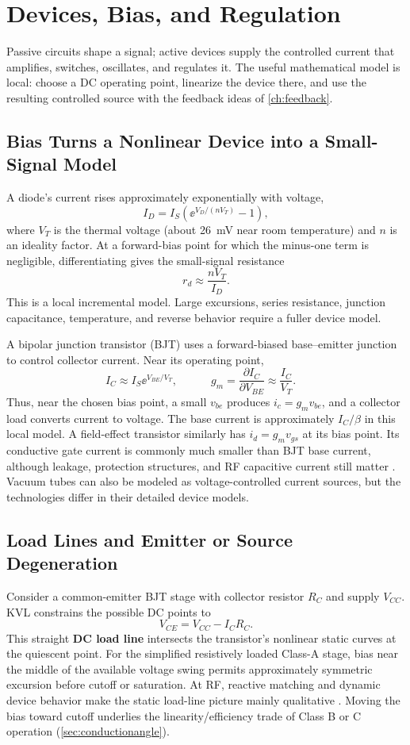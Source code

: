 \chapter{Devices, Bias, and Regulation}
\label{ch:devices}
Passive circuits shape a signal; active devices supply the controlled current that
amplifies, switches, oscillates, and regulates it.  The useful mathematical model
is local: choose a DC operating point, linearize the device there, and use the
resulting controlled source with the feedback ideas of \cref{ch:feedback}.

\section{Bias Turns a Nonlinear Device into a Small-Signal Model}
\label{sec:devicebias}
A diode's current rises approximately exponentially with voltage,
\[
I_D=I_S\left(\ee^{V_D/(nV_T)}-1\right),
\]
where \(V_T\) is the thermal voltage (about \SI{26}{\milli\volt} near room
temperature) and \(n\) is an ideality factor. At a forward-bias point for which the
minus-one term is negligible, differentiating gives the small-signal resistance
\[
\boxed{\quad r_d\approx\frac{nV_T}{I_D}.\quad}
\]
This is a local incremental model. Large excursions, series resistance, junction
capacitance, temperature, and reverse behavior require a fuller device model.

A bipolar junction transistor (BJT) uses a forward-biased base--emitter junction
to control collector current.  Near its operating point,
\[
I_C\approx I_S\ee^{V_{BE}/V_T},\qquad
\boxed{\quad g_m=\frac{\partial I_C}{\partial V_{BE}}
\approx\frac{I_C}{V_T}.\quad}
\]
Thus, near the chosen bias point, a small \(v_{be}\) produces
\(i_c=g_mv_{be}\), and a collector load converts current to voltage. The base
current is approximately \(I_C/\beta\) in this local model. A field-effect
transistor similarly has \(i_d=g_mv_{gs}\) at its bias point. Its conductive gate
current is commonly much smaller than BJT base current, although leakage, protection
structures, and RF capacitive current still matter
\cite[pp.~123--130]{bowick2008rfcircuit}. Vacuum tubes can also be modeled as
voltage-controlled current sources, but the technologies differ in their detailed
device models.

\section{Load Lines and Emitter or Source Degeneration}
\label{sec:loadlines}
Consider a common-emitter BJT stage with collector resistor \(R_C\) and supply
\(V_{CC}\).  KVL constrains the possible DC points to
\[
V_{CE}=V_{CC}-I_CR_C.
\]
This straight \textbf{DC load line} intersects the transistor's nonlinear static
curves at the quiescent point. For the simplified resistively loaded Class-A stage,
bias near the middle of the available voltage swing permits approximately symmetric
excursion before cutoff or saturation. At RF, reactive matching and dynamic device
behavior make the static load-line picture mainly qualitative
\cite[pp.~458--460]{nguyen2015rfic}. Moving the bias toward cutoff underlies the
linearity/efficiency trade of Class B or C operation (\cref{sec:conductionangle}).

